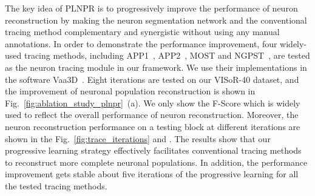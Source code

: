 The key idea of PLNPR is to progressively improve the performance of neuron reconstruction by making the neuron segmentation network and the conventional tracing method complementary and synergistic without using any manual annotations.
In order to demonstrate the performance improvement, four widely-used tracing methods, including APP1~\cite{Peng2011}, APP2~\cite{Xiao2013}, MOST\cite{Wu2014} and NGPST~\cite{Quan2015}, are tested as the neuron tracing module in our framework. 
We use their implementations in the software Vaa3D~\cite{Peng2014}. 
%
Eight iterations are tested on our VISoR-40 dataset, and the improvement of neuronal population reconstruction is shown in Fig.~\ref{fig:ablation_study_plnpr}~(a).
We only show the F-Score which is widely used to reflect the overall performance of neuron reconstruction.
%
Moreover, the neuron reconstruction performance on a testing block at different iterations are shown in the Fig.~\ref{fig:trace_iterations} and .
%
The results show that our progressive learning strategy effectively facilitates conventional tracing methods to reconstruct more complete neuronal populations.
In addition, the performance improvement gets stable about five iterations of the progressive learning for all the tested tracing methods. 

